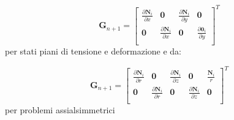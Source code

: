 \begin{equation}
	\mathbf{G}_{n+1} =
	\begin{bmatrix}
		\frac{\partial \mathbf{N}_i}{\partial x} & \mathbf{0}                                & \frac{\partial \mathbf{N}_i}{\partial y} & \mathbf{0}                                  \\
		\mathbf{0}                               & \frac{\partial \mathbf{N}_i}{\partial x}  & \mathbf{0}                               & \frac{\partial \mathbf{0}_i}{\partial y}    \\
	\end{bmatrix}^T
\end{equation}
per stati piani di tensione e deformazione e da:

\begin{equation}
	\mathbf{G}_{n+1} =
	\begin{bmatrix}
		\frac{\partial \mathbf{N}_i}{\partial r} & \mathbf{0}                                & \frac{\partial \mathbf{N}_i}{\partial z} & \mathbf{0}                               & \frac{ \mathbf{N}_i}{r} \\
		\mathbf{0}                               & \frac{\partial \mathbf{N}_i}{\partial r}  & \mathbf{0}                               & \frac{\partial \mathbf{N}_i}{\partial z} & \mathbf{0} \\
	\end{bmatrix}^T
\end{equation}
per problemi assialsimmetrici

